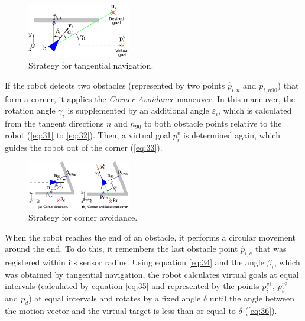 \documentclass[conference]{IEEEtran}
\begin{document}
\begin{figure}[h]
    \centering
    \includegraphics[width=0.4\textwidth]{Pictures/Strategy for tangential navigation.png}
    \caption{Strategy for tangential navigation.}
    \label{fig:Strategy for tangential navigation}
\end{figure}

If the robot detects two obstacles (represented by two points \( \hat{p}_{i,n} \) and \( \hat{p}_{i,n90} \)) 
that form a corner, it applies the \textit{Corner Avoidance} maneuver. 
In this maneuver, the rotation angle \( \gamma_i \) is supplemented by an additional angle \( \varepsilon_i \),
 which is calculated from the tangent directions $n$ and $n_{90}$ to both obstacle points 
relative to the robot 
(\eqref{eq:31} to \eqref{eq:32}). Then,
a virtual goal $p_i^v$ is determined again, which guides the robot out of the corner (\eqref{eq:33}).

\begin{figure}[h]
    \centering
    \includegraphics[width=0.4\textwidth]{Pictures/Strategy for corner avoidance.png}
    \caption{Strategy for corner avoidance.}
    \label{fig:Strategy for corner avoidance}
\end{figure}

When the robot reaches the end of an obstacle, it performs a 
circular movement around the end. To do this, it remembers the last 
obstacle point \( \hat{p}_{i,e} \) that was registered within its sensor radius. Using  
equation \eqref{eq:34} and the angle \( \beta_{i} \), which was obtained by tangential navigation,
 the robot calculates virtual goals at equal intervals (calculated 
by equation \eqref{eq:35} and represented by the points \( p_i^{v1} \), 
\( p_i^{v2} \) and \( p_d \)) at equal intervals and rotates by a 
fixed angle \( \delta \) until the angle between the motion vector and the virtual 
target is less than or equal to \( \delta \) (\eqref{eq:36}).
\end{document}
